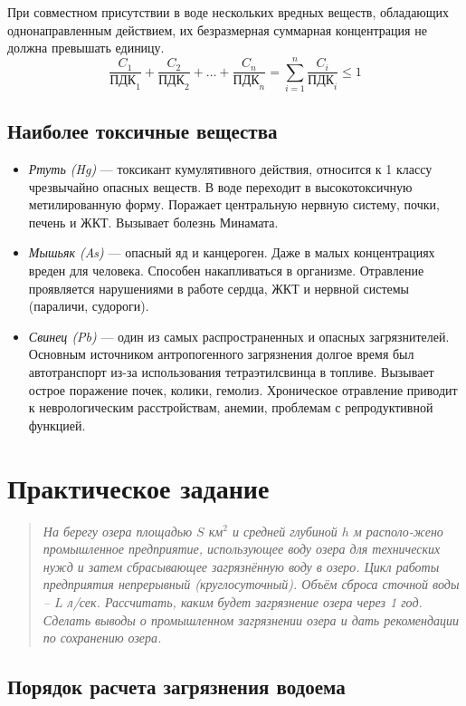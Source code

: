 При совместном присутствии в воде нескольких вредных веществ, обладающих однонаправленным действием, их безразмерная суммарная концентрация не должна превышать единицу.
$$
    \frac{C_1}{\text{ПДК}_1} + \frac{C_2}{\text{ПДК}_2} + \dots + \frac{C_n}{\text{ПДК}_n} = \sum_{i=1}^{n} \frac{C_i}{\text{ПДК}_i} \le 1
$$

\subsection*{Наиболее токсичные вещества}
\begin{itemize}
    \item \textit{Ртуть (Hg)} — токсикант кумулятивного действия, относится к 1 классу чрезвычайно опасных веществ. В воде переходит в высокотоксичную метилированную форму. Поражает центральную нервную систему, почки, печень и ЖКТ. Вызывает болезнь Минамата.
    \item \textit{Мышьяк (As)} — опасный яд и канцероген. Даже в малых концентрациях вреден для человека. Способен накапливаться в организме. Отравление проявляется нарушениями в работе сердца, ЖКТ и нервной системы (параличи, судороги).
    \item \textit{Свинец (Pb)} — один из самых распространенных и опасных загрязнителей. Основным источником антропогенного загрязнения долгое время был автотранспорт из-за использования тетраэтилсвинца в топливе. Вызывает острое поражение почек, колики, гемолиз. Хроническое отравление приводит к неврологическим расстройствам, анемии, проблемам с репродуктивной функцией.
\end{itemize}


\section*{Практическое задание}
\begin{quote}
    \textit{На берегу озера площадью $S$ км${}^2$ и средней глубиной $h$ м располо-жено промышленное предприятие, использующее воду озера для технических нужд и затем сбрасывающее загрязнённую воду в озеро. Цикл работы предприятия непрерывный (круглосуточный). Объём сброса сточной воды – $L$ л/сек. Рассчитать, каким будет загрязнение озера через 1 год. Сделать выводы о промышленном загрязнении озера и дать рекомендации по сохранению озера.}
\end{quote}

\subsection*{Порядок расчета загрязнения водоема}

